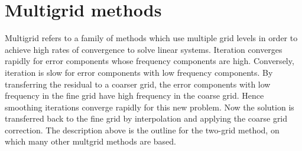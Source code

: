 \section{Multigrid methods}

Multigrid refers to a family of methods which use multiple grid levels in order to achieve high rates of convergence to solve linear systems.
Iteration converges rapidly for error components whose frequency components are high.
Conversely, iteration is slow for error components with low frequency components.
By transferring the residual to a coarser grid, the error components with low frequency in the fine grid have high frequency in the coarse grid.
Hence smoothing iterations converge rapidly for this new problem.
Now the solution is transferred back to the fine grid by interpolation and applying the coarse grid correction.
The description above is the outline for the two-grid method, on which many other multgrid methods are based.


